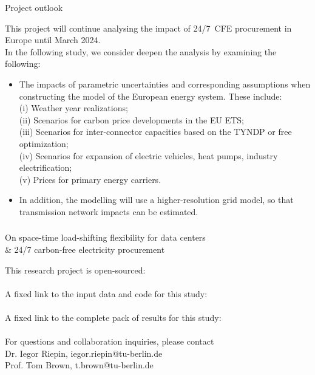 \begin{frame}{Project outlook}
  
  This project will continue analysing the impact of 24/7~CFE procurement in Europe until March 2024. \\
  In the following study, we consider deepen the analysis by examining the following:

    \begin{itemize}
      \item The impacts of \alert{parametric uncertainties} and corresponding assumptions when constructing the model of 
      the European energy system. These include: \\
      \quad (i) Weather year realizations; \\
      \quad (ii) Scenarios for carbon price developments in the EU ETS; \\
      \quad (iii) Scenarios for inter-connector capacities based on the TYNDP or free optimization; \\
      \quad (iv) Scenarios for expansion of electric vehicles, heat pumps, industry electrification; \\
      \quad (v) Prices for primary energy carriers. 
      \item In addition, the modelling will use a \alert{higher-resolution grid} model,
       so that transmission network impacts can be estimated.
    \end{itemize}

\end{frame}



\begin{frame}\frametitle{\quad}

  {\Large
  \alert{On space-time load-shifting flexibility for data centers \\ 
  \& 24/7 carbon-free electricity procurement}
  }

  \vspace{.3cm}
  This research project is open-sourced: \\
  \faGithub~ \\
  A fixed link to the input data and code for this study: \\
  \faLink~ \\
  A fixed link to the complete pack of results for this study: \\
  \faLink~ \\

  \vspace{.3cm}
  For questions and collaboration inquiries, please contact \\
  Dr. Iegor Riepin, iegor.riepin@tu-berlin.de \\
  Prof. Tom Brown, t.brown@tu-berlin.de

\end{frame}

